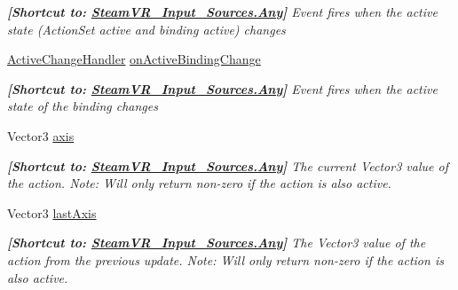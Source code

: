 \begin{DoxyCompactItemize}
\begin{DoxyCompactList}\small\item\em {\bfseries{\mbox{[}Shortcut to\+: \mbox{\hyperlink{namespace_valve_1_1_v_r_a82e5bf501cc3aa155444ee3f0662853faed36a1ef76a59ee3f15180e0441188ad}{Steam\+V\+R\+\_\+\+Input\+\_\+\+Sources.\+Any}}\mbox{]}}} Event fires when the active state (Action\+Set active and binding active) changes \end{DoxyCompactList}\item 
\mbox{\hyperlink{class_valve_1_1_v_r_1_1_steam_v_r___action___vector3_a47d6c1c558fb45841cd626df9ab3dcb9}{Active\+Change\+Handler}} \mbox{\hyperlink{class_valve_1_1_v_r_1_1_steam_v_r___action___vector3_adf4506e3d4074903743a4f8e059b3f8a}{on\+Active\+Binding\+Change}}
\begin{DoxyCompactList}\small\item\em {\bfseries{\mbox{[}Shortcut to\+: \mbox{\hyperlink{namespace_valve_1_1_v_r_a82e5bf501cc3aa155444ee3f0662853faed36a1ef76a59ee3f15180e0441188ad}{Steam\+V\+R\+\_\+\+Input\+\_\+\+Sources.\+Any}}\mbox{]}}} Event fires when the active state of the binding changes \end{DoxyCompactList}\item 
Vector3 \mbox{\hyperlink{class_valve_1_1_v_r_1_1_steam_v_r___action___vector3_a915afdc4075b4df59abf6f9797eadd36}{axis}}
\begin{DoxyCompactList}\small\item\em {\bfseries{\mbox{[}Shortcut to\+: \mbox{\hyperlink{namespace_valve_1_1_v_r_a82e5bf501cc3aa155444ee3f0662853faed36a1ef76a59ee3f15180e0441188ad}{Steam\+V\+R\+\_\+\+Input\+\_\+\+Sources.\+Any}}\mbox{]}}} The current Vector3 value of the action. Note\+: Will only return non-\/zero if the action is also active. \end{DoxyCompactList}\item 
Vector3 \mbox{\hyperlink{class_valve_1_1_v_r_1_1_steam_v_r___action___vector3_a80ebc3715ac17d087f83064081fc5b70}{last\+Axis}}
\begin{DoxyCompactList}\small\item\em {\bfseries{\mbox{[}Shortcut to\+: \mbox{\hyperlink{namespace_valve_1_1_v_r_a82e5bf501cc3aa155444ee3f0662853faed36a1ef76a59ee3f15180e0441188ad}{Steam\+V\+R\+\_\+\+Input\+\_\+\+Sources.\+Any}}\mbox{]}}} The Vector3 value of the action from the previous update. Note\+: Will only return non-\/zero if the action is also active. \end{DoxyCompactList}\item 

\end{DoxyCompactItemize}
